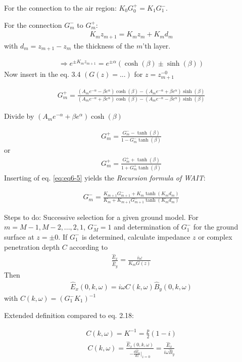 For the connection to the air region: $K_0G_0^+=K_1G_1^-$.

For the connection $G_m^-$ to $G_m^+$:
\begin{align}
K_mz_{m+1}=K_mz_m+K_md_m
\label{eq:eq6-5}
\end{align}
with $d_m=z_{m+1}-z_m$ the thickness of the $m$'th layer.

\begin{align*}
\Rightarrow e^{\pm K_mz_{m+1}}=e^{\pm\alpha}\left(\cosh(\beta)\pm\sinh(\beta)\right)
\end{align*}
Now insert in the eq. 3.4 $(G(z) = ...)$ for $z=z_{m+1}^{-0}$

\begin{align}
G_m^+=\frac{(A_me^{-\alpha}-\beta e^\alpha)\cosh(\beta)-(A_me^{-\alpha}+\beta e^\alpha)\sinh(\beta)}{(A_me^{-\alpha}+\beta e^\alpha)\cosh(\beta)-(A_me^{-\alpha}-\beta e^\alpha)\sinh(\beta)}
\end{align}

Divide by $(A_me^{-\alpha}+\beta e^\alpha)\cosh(\beta)$

\begin{align*}
G_m^+=\frac{G_m^--\tanh(\beta)}{1-G_m^-\tanh(\beta)}
\end{align*}
or 
\begin{align*}
G_m^+=\frac{G_m^++\tanh(\beta)}{1+G_m^+\tanh(\beta)}
\end{align*}
Inserting of eq. \eqref{eq:eq6-5} yields the \textit{Recursion formula of WAIT}:

\begin{align}
G_m^-=\frac{K_{m+1}G_{m+1}^-+K_m\tanh(K_md_m)}{K_m+K_{m+1}G_{m+1}^-\tanh(K_md_m)}
\end{align}


Steps to do:
Successive selection for a given ground model. For $m=M-1,M-2,...,2,1$, $G_M^-=1$ and determination of $G_1^-$ for the ground surface at $z=\pm 0$. If $G_1^-$ is determined, calculate impedance $z$ or complex penetration depth $C$ according to
\begin{align*}
\frac{\hat{E}_x}{\hat{E}_y}=\frac{i\omega}{K_mG(z)}
\end{align*}
Then 
\begin{align}
\hat{E}_x(0,k,\omega)=i\omega C(k,\omega)\hat{B}_y(0,k,\omega)
\end{align}
with $C(k,\omega)=(G_1^-K_1)^{-1}$

Extended definition compared to eq. 2.18:

\begin{align*}
C(k,\omega)=K^{-1}=\frac{p}{2}(1-i)
\end{align*}
\begin{align}
C(k,\omega)=\frac{\hat{E}_x(0,k,\omega)}{-\frac{d\hat{E}_x}{dz}\bigg|_{z=0}}=\frac{\hat{E}_x}{i\omega\hat{B}_y}
\end{align}

